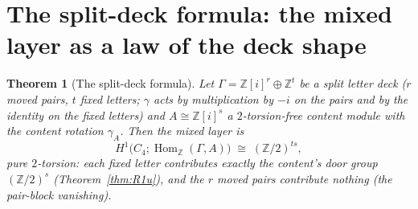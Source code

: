 \documentclass[11pt]{article}
\newcommand{\Z}{\mathbb Z}
\newcommand{\Hom}{\operatorname{Hom}}
\newtheorem{theorem}{Theorem}[section]
\begin{document}
\section{The split-deck formula: the mixed layer as a law of the deck
shape}\label{sec:split}

\begin{theorem}[The split-deck formula]\label{thm:split}
Let $\Gamma=\Z[i]^r\oplus\Z^t$ be a split letter deck ($r$ moved
pairs, $t$ fixed letters; $\gamma$ acts by multiplication by $-i$ on
the pairs and by the identity on the fixed letters) and
$A\cong\Z[i]^s$ a $2$-torsion-free content module with the content
rotation $\gamma_A$. Then the mixed layer is
\[
H^1\bigl(C_4;\Hom_\Z(\Gamma,A)\bigr)\;\cong\;(\Z/2)^{ts},
\]
pure $2$-torsion: each fixed letter contributes exactly the content's
door group $(\Z/2)^s$ (Theorem~\ref{thm:R1u}), and the $r$ moved
pairs contribute \emph{nothing} (the pair-block vanishing).
\end{theorem}
\end{document}
